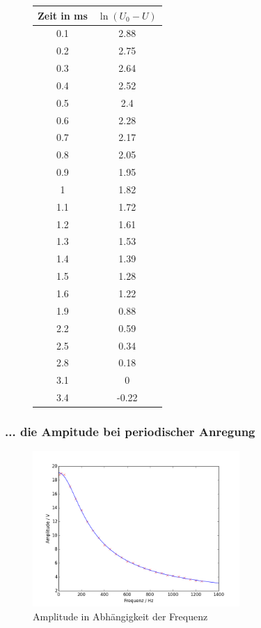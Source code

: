 \begin{figure}[h!]
	\centering
	\begin{tabular}{c|c}
		Zeit in \si{\milli\second}& $\ln(U_0-U)$ \\
		\hline
		0.1 &  2.88 \\
		0.2 &  2.75 \\
		0.3 &  2.64 \\
		0.4 &  2.52 \\
		0.5 &  2.4  \\
		0.6 &  2.28 \\
		0.7 &  2.17 \\
		0.8 &  2.05 \\
		0.9 &  1.95 \\
		1   &  1.82 \\
		1.1 &  1.72 \\
		1.2 &  1.61 \\
		1.3 &  1.53 \\
		1.4 &  1.39 \\
		1.5 &  1.28 \\
		1.6 &  1.22 \\
		1.9 &  0.88 \\
		2.2 &  0.59 \\
		2.5 &  0.34 \\
		2.8 &  0.18 \\
		3.1 &  0    \\
		3.4 & -0.22 \\
	\end{tabular}
	\label{tab:aufladekurve}
\end{figure}



\clearpage
\subsubsection{... die Ampitude bei periodischer Anregung}
\begin{figure}[h!]
\centering
\includegraphics[width=0.7\textwidth]{Amplitude.png}
\caption{Amplitude in Abhängigkeit der Frequenz}
\label{fig:amplitude}
\end{figure} 


